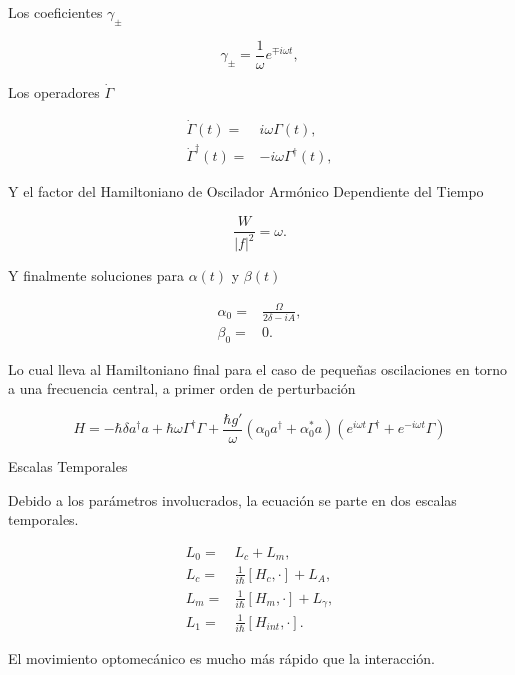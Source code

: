 \documentclass[11pt]{beamer}
\begin{document}
\begin{frame}
Los coeficientes $\gamma_\pm$

\begin{equation}
\gamma_\pm= \frac{1}{\omega}e^{\mp i\omega t},
\end{equation}

Los operadores $\dot{\Gamma}$

\begin{align}
\dot{\Gamma}(t) =& i\omega \Gamma(t),\\
\dot{\Gamma}^\dagger(t) =& -i\omega \Gamma^\dagger(t),
\end{align}

Y el factor del Hamiltoniano de Oscilador Armónico Dependiente del Tiempo

\begin{equation}
\frac{W}{|f|^2} = \omega.
\end{equation}

\end{frame}

\begin{frame}
Y finalmente soluciones para $\alpha(t)$ y $\beta(t)$

\begin{align}
\alpha_0 =& \frac{\Omega}{2\delta-iA},\\
\beta_0 =& 0.
\end{align}

Lo cual lleva al Hamiltoniano final para el caso de pequeñas oscilaciones en torno a una frecuencia central, a primer orden de perturbación

\begin{equation}
H = -\hbar \delta a^{\dagger}a +\hbar\omega\Gamma^{\dagger}\Gamma +\frac{\hbar g'}{\omega}(\alpha_0 a^{\dagger}+\alpha^*_0 a)(e^{i\omega t}\Gamma^{\dagger}+e^{-i\omega t}\Gamma)
\end{equation}
\end{frame}

\begin{frame}{Escalas Temporales}

Debido a los parámetros involucrados, la ecuación se parte en dos escalas temporales. 

\begin{align*}
L_0 =& L_c + L_m,\\
L_c =& \frac{1}{i\hbar}[H_c,\cdot] + L_A,\\
L_m =& \frac{1}{i\hbar}[H_m,\cdot] + L_\gamma,\\
L_1 =& \frac{1}{i\hbar}[H_{int},\cdot].
\end{align*}

El movimiento optomecánico es mucho más rápido que la interacción.


\end{frame}
\end{document}
